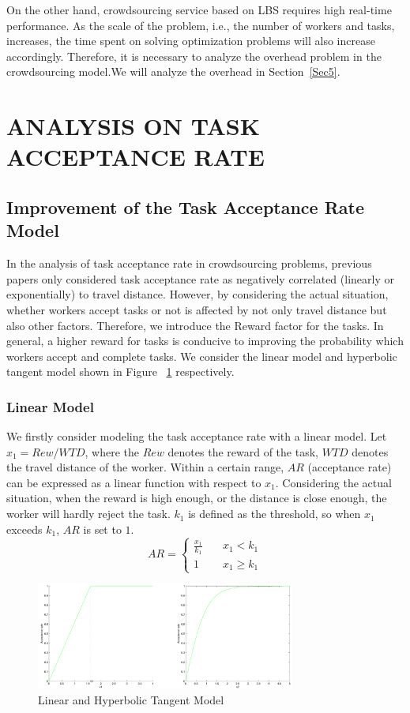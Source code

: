On the other hand, crowdsourcing service based on LBS requires high real-time performance. As the scale of the problem, i.e., the number of workers and tasks, increases, the time spent on solving optimization problems will also increase accordingly. Therefore, it is necessary to analyze the overhead problem in the crowdsourcing model.We will analyze the overhead in Section~\ref{Sec5}.

\section{ANALYSIS ON TASK ACCEPTANCE RATE} %
\subsection{Improvement of the Task Acceptance Rate Model} %
\label{Sec4.1}
In the analysis of task acceptance rate in crowdsourcing problems, previous papers only considered task acceptance rate as negatively correlated (linearly or exponentially) to travel distance. However, by considering the actual situation, whether workers accept tasks or not is affected by not only travel distance but also other factors. Therefore, we introduce the Reward factor for the tasks. In general, a higher reward for tasks is conducive to improving the probability which workers accept and complete tasks. We consider the linear model and hyperbolic tangent model shown in Figure ~\ref{img:LinTanh} respectively.

\subsubsection{Linear Model}
We firstly consider modeling the task acceptance rate with a linear model. Let $x_1=Rew/WTD$, where the $Rew$ denotes the reward of the task, $WTD$ denotes the travel distance of the worker. Within a certain range, $AR$ (acceptance rate) can be expressed as a linear function with respect to $x_1$. Considering the actual situation, when the reward is high enough, or the distance is close enough, the worker will hardly reject the task. $k_1$ is defined as the threshold, so when $x_1$ exceeds $k_1$, $AR$ is set to $1$.
$$
	AR= \left \{
	\begin{array}{cl}
	\frac{x_1}{k_1} \quad & \mbox{$x_1<k_1$} \\
	1 \quad & \mbox{$x_1 \geq k_1$}
	\end{array}
	\right.
$$

\begin{figure}
\includegraphics[width=8.5cm]{LinTanh}
\caption{Linear and Hyperbolic Tangent Model}
\label{img:LinTanh}
\end{figure}

